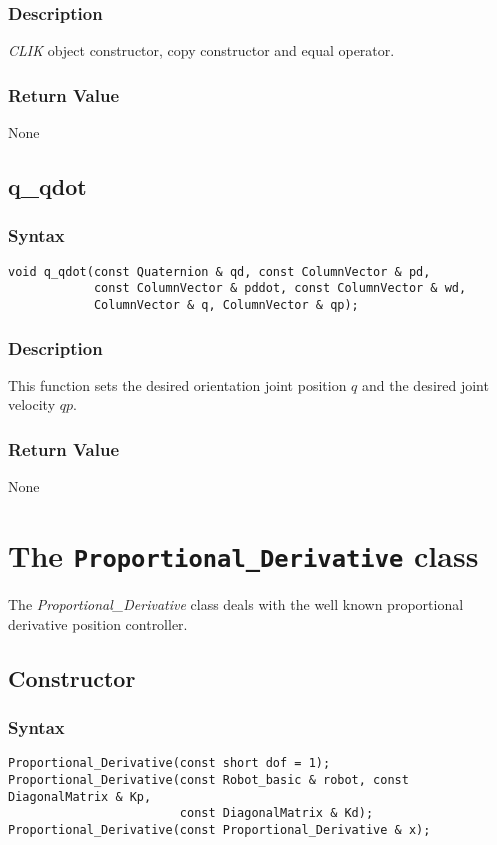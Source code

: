 \documentclass[11pt,fleqn,letterpaper]{report}
\begin{document}
\subsubsection*{Description}   
\emph{CLIK} object constructor, copy constructor and equal operator.

\subsubsection*{Return Value}

None

\newpage

\subsection*{q\_qdot}
\subsubsection*{Syntax}
\begin{verbatim}
void q_qdot(const Quaternion & qd, const ColumnVector & pd, 
            const ColumnVector & pddot, const ColumnVector & wd,
            ColumnVector & q, ColumnVector & qp);
\end{verbatim}

\subsubsection*{Description}   
This function sets the desired orientation joint position $q$ and the
desired joint velocity $qp$.
\subsubsection*{Return Value}

None

\newpage

\section{The \texttt{Proportional\_Derivative} class}

The \emph{Proportional\_Derivative} class deals with the well known
proportional derivative position controller.

\subsection*{Constructor}
\subsubsection*{Syntax}
\begin{verbatim}
Proportional_Derivative(const short dof = 1);
Proportional_Derivative(const Robot_basic & robot, const DiagonalMatrix & Kp, 
                        const DiagonalMatrix & Kd);
Proportional_Derivative(const Proportional_Derivative & x);
\end{verbatim}
\end{document}
